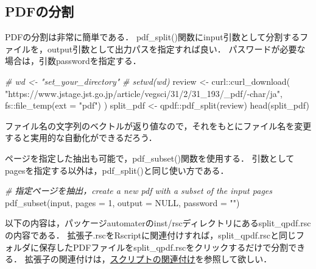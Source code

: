 \documentclass[
]{article}
\newenvironment{Shaded}{\begin{snugshade}}{\end{snugshade}}
\newcommand{\AttributeTok}[1]{\textcolor[rgb]{0.77,0.63,0.00}{#1}}
\newcommand{\CommentTok}[1]{\textcolor[rgb]{0.56,0.35,0.01}{\textit{#1}}}
\newcommand{\ConstantTok}[1]{\textcolor[rgb]{0.00,0.00,0.00}{#1}}
\newcommand{\DecValTok}[1]{\textcolor[rgb]{0.00,0.00,0.81}{#1}}
\newcommand{\FunctionTok}[1]{\textcolor[rgb]{0.00,0.00,0.00}{#1}}
\newcommand{\NormalTok}[1]{#1}
\newcommand{\OtherTok}[1]{\textcolor[rgb]{0.56,0.35,0.01}{#1}}
\newcommand{\SpecialCharTok}[1]{\textcolor[rgb]{0.00,0.00,0.00}{#1}}
\newcommand{\StringTok}[1]{\textcolor[rgb]{0.31,0.60,0.02}{#1}}
\begin{document}
\hypertarget{pdfux306eux5206ux5272}{%
\subsection{PDFの分割}\label{pdfux306eux5206ux5272}}

PDFの分割は非常に簡単である．
pdf\_split()関数にinput引数として分割するファイルを，output引数として出力パスを指定すれば良い．
パスワードが必要な場合は，引数passwordを指定する．

\begin{Shaded}
\begin{Highlighting}[]
  \CommentTok{\# wd \textless{}{-} "set\_your\_directory"}
  \CommentTok{\# setwd(wd)}
\NormalTok{review }\OtherTok{\textless{}{-}} 
\NormalTok{  curl}\SpecialCharTok{::}\FunctionTok{curl\_download}\NormalTok{(}
    \StringTok{"https://www.jstage.jst.go.jp/article/vegsci/31/2/31\_193/\_pdf/{-}char/ja"}\NormalTok{, }
\NormalTok{    fs}\SpecialCharTok{::}\FunctionTok{file\_temp}\NormalTok{(}\AttributeTok{ext =} \StringTok{"pdf"}\NormalTok{)}
\NormalTok{    )}
\NormalTok{split\_pdf }\OtherTok{\textless{}{-}}\NormalTok{ qpdf}\SpecialCharTok{::}\FunctionTok{pdf\_split}\NormalTok{(review)}
\FunctionTok{head}\NormalTok{(split\_pdf)}
\end{Highlighting}
\end{Shaded}

ファイル名の文字列のベクトルが返り値なので，それをもとにファイル名を変更すると実用的な自動化ができるだろう．

ページを指定した抽出も可能で，pdf\_subset()関数を使用する．
引数としてpagesを指定する以外は，pdf\_split()と同じ使い方である．

\begin{Shaded}
\begin{Highlighting}[]
  \CommentTok{\# 指定ページを抽出，create a new pdf with a subset of the input pages}
\FunctionTok{pdf\_subset}\NormalTok{(input, }\AttributeTok{pages =} \DecValTok{1}\NormalTok{, }\AttributeTok{output =} \ConstantTok{NULL}\NormalTok{, }\AttributeTok{password =} \StringTok{""}\NormalTok{)}
\end{Highlighting}
\end{Shaded}

以下の内容は，パッケージautomaterのinst/rscディレクトリにあるsplit\_qpdf.rscの内容である．
拡張子.rscをRscriptに関連付けすれば，split\_qpdf.rscと同じフォルダに保存したPDFファイルをsplit\_qpdf.rscをクリックするだけで分割できる．
拡張子の関連付けは，\protect\hyperlink{assoc}{スクリプトの関連付け}を参照して欲しい．
\end{document}
